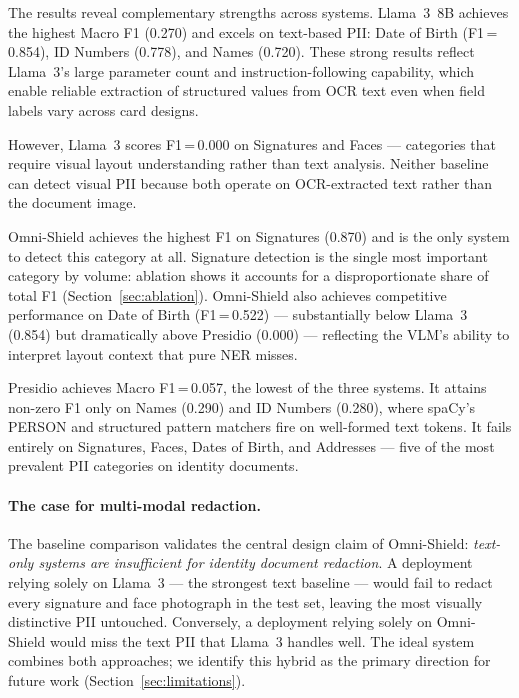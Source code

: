 \documentclass[conference]{IEEEtran}
\begin{document}
The results reveal complementary strengths across
systems.
Llama~3~8B achieves the highest Macro F1 (0.270)
and excels on text-based PII: Date of Birth
(F1\,=\,0.854), ID Numbers (0.778), and Names
(0.720).
These strong results reflect Llama~3's large
parameter count and instruction-following capability,
which enable reliable extraction of structured
values from OCR text even when field labels vary
across card designs.

However, Llama~3 scores F1\,=\,0.000 on Signatures
and Faces --- categories that require visual layout
understanding rather than text analysis.
Neither baseline can detect visual PII because both
operate on OCR-extracted text rather than the
document image.

Omni-Shield achieves the highest F1 on Signatures
(0.870) and is the only system to detect this
category at all.
Signature detection is the single most important
category by volume: ablation shows it accounts for
a disproportionate share of total F1
(Section~\ref{sec:ablation}).
Omni-Shield also achieves competitive performance
on Date of Birth (F1\,=\,0.522) --- substantially
below Llama~3 (0.854) but dramatically above
Presidio (0.000) --- reflecting the VLM's ability
to interpret layout context that pure NER misses.

Presidio achieves Macro F1\,=\,0.057, the lowest
of the three systems.
It attains non-zero F1 only on Names (0.290) and
ID Numbers (0.280), where spaCy's PERSON and
structured pattern matchers fire on well-formed
text tokens.
It fails entirely on Signatures, Faces, Dates of
Birth, and Addresses --- five of the most prevalent
PII categories on identity documents.

\paragraph{The case for multi-modal redaction.}
The baseline comparison validates the central design
claim of Omni-Shield: \emph{text-only systems are
insufficient for identity document redaction}.
A deployment relying solely on Llama~3 --- the
strongest text baseline --- would fail to redact
every signature and face photograph in the test
set, leaving the most visually distinctive PII
untouched.
Conversely, a deployment relying solely on
Omni-Shield would miss the text PII that Llama~3
handles well.
The ideal system combines both approaches; we
identify this hybrid as the primary direction for
future work (Section~\ref{sec:limitations}).

\end{document}

